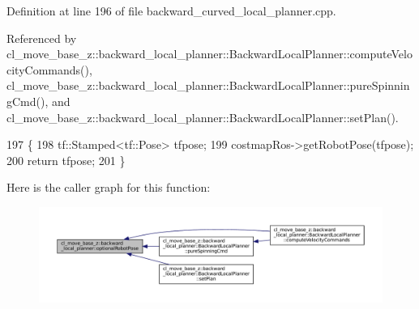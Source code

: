 Definition at line 196 of file backward\+\_\+curved\+\_\+local\+\_\+planner.\+cpp.



Referenced by cl\+\_\+move\+\_\+base\+\_\+z\+::backward\+\_\+local\+\_\+planner\+::\+Backward\+Local\+Planner\+::compute\+Velocity\+Commands(), cl\+\_\+move\+\_\+base\+\_\+z\+::backward\+\_\+local\+\_\+planner\+::\+Backward\+Local\+Planner\+::pure\+Spinning\+Cmd(), and cl\+\_\+move\+\_\+base\+\_\+z\+::backward\+\_\+local\+\_\+planner\+::\+Backward\+Local\+Planner\+::set\+Plan().


\begin{DoxyCode}
197         \{
198             tf::Stamped<tf::Pose> tfpose;
199             costmapRos->getRobotPose(tfpose);
200             \textcolor{keywordflow}{return} tfpose;
201         \}
\end{DoxyCode}
Here is the caller graph for this function\+:
\nopagebreak
\begin{figure}[H]
\begin{center}
\leavevmode
\includegraphics[width=350pt]{namespacecl__move__base__z_1_1backward__local__planner_afd5bb2a0d144f7b89f4215fbcb1fbe69_icgraph}
\end{center}
\end{figure}
